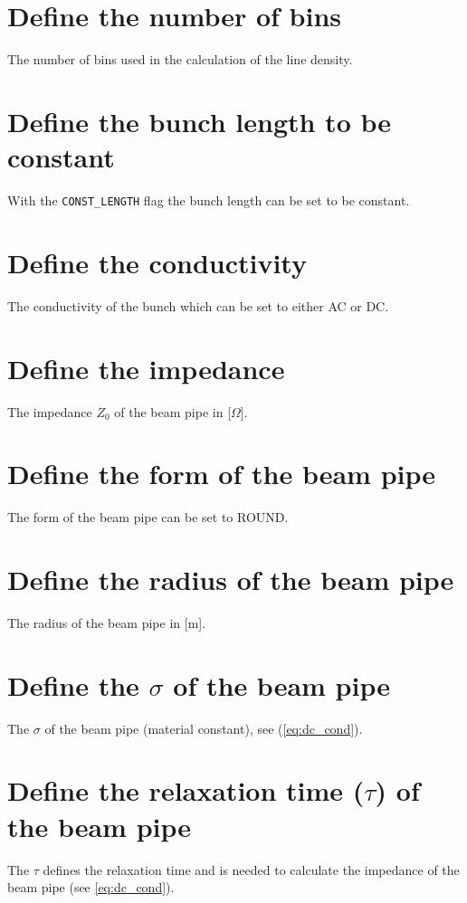 \section{Define the number of bins}
\label{sec:NBIN}
The number of bins used in the calculation of the line density.

\section{Define the bunch length to be constant}
\label{sec:CONSTLEN}
With the \texttt{CONST\_LENGTH} flag the bunch length can be set to be constant.

\section{Define the conductivity}
\label{sec:CONDUCT}
The conductivity of the bunch which can be set to either AC or DC.

\section{Define the impedance}
\label{sec:Z}
The impedance $Z_0$ of the beam pipe in [$\Omega$].

\section{Define the form of the beam pipe}
\label{sec:FROM}
The form of the beam pipe can be set to ROUND.

\section{Define the radius of the beam pipe}
\label{sec:RADIUS}
The radius of the beam pipe in [m].

\section{Define the $\sigma$ of the beam pipe}
\label{sec:SIGMA}
The $\sigma$ of the beam pipe (material constant), see (\ref{eq:dc_cond}).

\section{Define the relaxation time ($\tau$) of the beam pipe}
\label{sec:TAU}
The $\tau$ defines the relaxation time and is needed to calculate the impedance of the beam pipe (see \ref{eq:dc_cond}).

